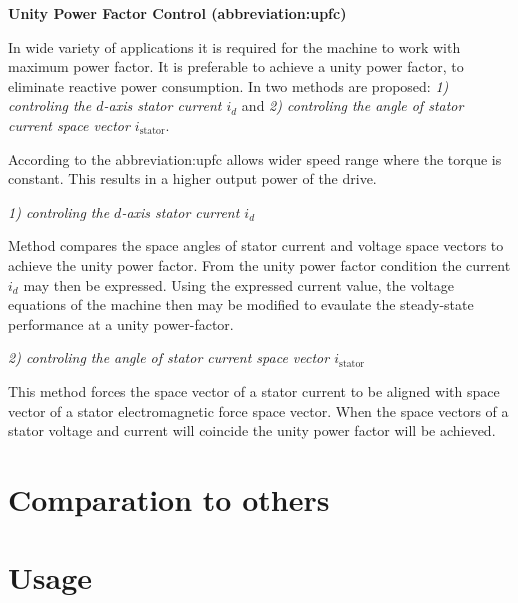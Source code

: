 \documentclass[a4paper, twoside, 11pt]{article}
\begin{document}
            \vspace*{1.5cm}
             \hspace*{-\parindent} \textbf{Unity Power Factor Control (\gls{abbreviation:upfc})}\par
             \parskip In wide variety of applications it is required for the machine to work with maximum power factor. It is preferable to achieve a unity power factor, to eliminate reactive power consumption. In \cite{moussa-unity-power-factor-control-of-permanent-magnet-motor-drive-system} two methods are proposed: \textit{1) controling the $d$-axis stator current $i_d$} and \textit{2) controling the angle of stator current space vector $i_\text{stator}$}.\par
             According to \cite{moussa-unity-power-factor-control-of-permanent-magnet-motor-drive-system} the \gls{abbreviation:upfc} allows wider speed range where the torque is constant. This results in a higher output power of the drive.\par

             \vspace*{1cm}
             \textit{1) controling the $d$-axis stator current $i_d$}\par
             \parskip Method compares the space angles of stator current and voltage space vectors to achieve the unity power factor. From the unity power factor condition the current $i_d$ may then be expressed. Using the expressed current value, the voltage equations of the machine then may be modified to evaulate the steady-state performance at a unity power-factor. \cite{moussa-unity-power-factor-control-of-permanent-magnet-motor-drive-system}

             \vspace*{1cm}
             \textit{2) controling the angle of stator current space vector $i_\text{stator}$}\par
             \parskip This method forces the space vector of a stator current to be aligned with space vector of a stator electromagnetic force space vector. When the space vectors of a stator voltage and current will coincide the unity power factor will be achieved. \cite{moussa-unity-power-factor-control-of-permanent-magnet-motor-drive-system}

\section{Comparation to others}

\section{Usage}
\end{document}
